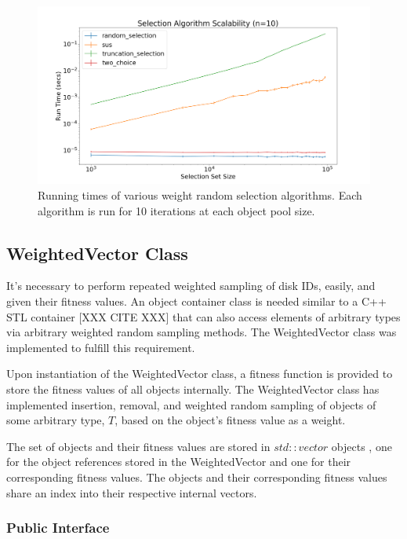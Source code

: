 \documentclass[12pt]{article}
\begin{document}
    \begin{figure}[h]
      \centering
      \includegraphics[scale=0.25]{images/random_scalability.png} 
      \caption{Running times of various weight random selection algorithms.
               Each algorithm is run for 10 iterations at each object pool
               size.}
      \label{fig:random_scalability}
    \end{figure}

  \subsection{WeightedVector Class}


  It's necessary to perform repeated weighted sampling of disk IDs, easily, and
  given their fitness values. An object container class is needed similar to a
  C++ STL container [XXX CITE XXX] that can also access elements of arbitrary
  types via arbitrary weighted random sampling methods. The WeightedVector
  class was implemented to fulfill this requirement. 

  Upon instantiation of the WeightedVector class, a fitness function is
  provided to store the fitness values of all objects internally. The
  WeightedVector class has implemented insertion, removal, and weighted random
  sampling of objects of some arbitrary type, $T$, based on the object's
  fitness value as a weight.

  The set of objects and their fitness values are stored in $std::vector$
  objects , one for the object references stored in the WeightedVector and one
  for their corresponding fitness values. The objects and their corresponding
  fitness values share an index into their respective internal vectors.

    \subsubsection{Public Interface}
\end{document}
